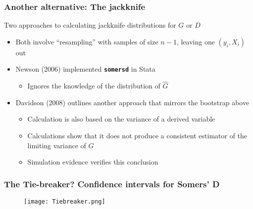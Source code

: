 \documentclass{beamer}
\begin{document}
\begin{frame}
\frametitle{Another alternative: The jackknife}

Two approaches to calculating jackknife distributions for $G$ or $D$
\begin{itemize}
    \item Both involve ``resampling'' with samples of size $n - 1$, leaving one $(y_i, X_i)$ out
    \item Newson (2006) implemented \textbf{\texttt{somersd}} in Stata
    \begin{itemize}
        \item Ignores the knowledge of the distribution of $\hat{G}$
    \end{itemize}
    \item Davidson (2008) outlines another approach that mirrors the bootstrap above
    \begin{itemize}
        \item Calculation is also based on the variance of a derived variable
        \item Calculations show that it does not produce a consistent estimator of the limiting variance of $G$
        \item Simulation evidence verifies this conclusion
    \end{itemize}
\end{itemize}

\end{frame}


\begin{frame}
\frametitle{The Tie-breaker? Confidence intervals for Somers' D}

\begin{figure}
    \texttt{[image: Tiebreaker.png]} %
\end{figure}

\end{frame}


\end{document}

